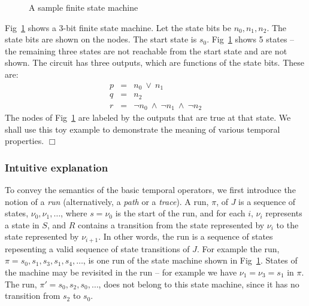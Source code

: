 \begin{figure}[htb]
\centering
\center
\caption{A sample finite state machine} \label{fig2.3}
\end{figure}


\begin{example} \label{ex2.1}
Fig~\ref{fig2.3} shows a 3-bit finite state machine. Let the state bits be
$n_0, n_1, n_2$. The state bits are shown on the nodes. The start state is
$s_0$. Fig~\ref{fig2.3} shows 5 states -- the remaining three states are
not reachable from the start state and are not shown. The circuit has
three outputs, which are functions of the state bits. These are:
\begin{eqnarray*}
p & = & n_0\ \lor\ n_1 \\
q & = & n_2 \\
r & = & \neg n_0\ \land\ \neg n_1\ \land\ \neg n_2
\end{eqnarray*}
The nodes of Fig~\ref{fig2.3} are labeled by the outputs that are true at
that state. We shall use this toy example to demonstrate the meaning of 
various temporal properties. $\Box$
\end{example}

\subsubsection{Intuitive explanation}
\noindent
To convey the semantics of the basic temporal operators, we first
introduce the notion of a {\em run} (alternatively, a {\em path} or a 
{\em trace}). A run, $\pi$, of $J$ is a sequence of states,
$\nu_0, \nu_1, \ldots$, where $s = \nu_0$ is the start of the run, and for
each $i$, $\nu_i$ represents a state in $S$, and $R$ contains a transition 
from the state represented by $\nu_i$ to the state represented by $\nu_{i+1}$.
In other words, the run is a sequence of states repesenting a valid sequence
of state transitions of $J$. For example the run,
$\pi = s_0, s_1, s_3, s_1, s_4, \ldots$, is one run of the state machine shown
in Fig~\ref{fig2.3}. States of the machine may be revisited in the run --
for example we have $\nu_1 = \nu_3 = s_1$ in $\pi$. The run, 
$\pi' = s_0, s_2, s_0, \ldots$, does not belong to this state machine, since
it has no transition from $s_2$ to $s_0$.


